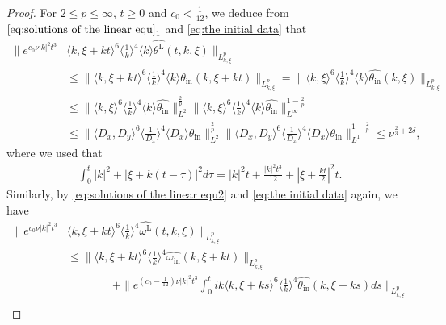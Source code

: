 \documentclass[reqno, 12pt]{amsart} %
\theoremstyle{plain} %
\theoremstyle{definition}
\theoremstyle{remark}
\numberwithin{equation}{section} %
\begin{document}
	\begin{proof}
		For $2\leq p \leq \infty$, $t\geq 0$ and $c_0 <\frac{1}{12}$, we deduce from $\eqref{eq:solutions of the linear equ}_1$ and \eqref{eq:the initial data} that
		\begin{equation*}\begin{aligned}
				\|e^{c_0 \nu |k|^2 t^3} & \langle k, \xi + kt \rangle^6\langle\frac{1}{k}\rangle^4 \langle k \rangle \widehat{\theta^{\mathrm{L}} }(t, k, \xi) \|_{L_{k, \xi}^p}\\
				&\leq \| \langle k, \xi + kt \rangle^6\langle\frac{1}{k}\rangle^4 \langle k \rangle \widehat{\theta_{\text {in}} }(k, \xi+k t) \|_{L_{k, \xi}^p} 
				= \| \langle k, \xi \rangle^6\langle\frac{1}{k}\rangle^4 \langle k \rangle \widehat{\theta_{\text {in}} }(k, \xi) \|_{L_{k, \xi}^p} \\
				&\leq  \| \langle k, \xi \rangle^6\langle\frac{1}{k}\rangle^4 \langle k \rangle \widehat{\theta_{\text {in}} } \|_{L^2}^{\frac2p} \| \langle k, \xi \rangle^6\langle\frac{1}{k}\rangle^4 \langle k \rangle \widehat{\theta_{\text {in}} }\|_{L^\infty}^{1- \frac2p} \\
				&\leq \|\langle D_x, D_y\rangle^6\langle\frac{1}{D_x}\rangle^4 \langle D_x \rangle \theta_{\mathrm{in}}\|_{L^2}^{\frac2p} \|\langle D_x, D_y\rangle^6\langle\frac{1}{D_x}\rangle^4 \langle D_x \rangle \theta_{\mathrm{in}}\|_{L^1}^{1- \frac2p} 
				\leq  \nu^{\frac23 + 2\delta},
		\end{aligned}\end{equation*}
		where we used that
		\begin{equation*}\begin{aligned}
				\int_0^t|k|^2+|\xi+k(t-\tau)|^2 d \tau =|k|^2 t+\frac{|k|^2 t^3}{12}+\left|\xi+\frac{k t}{2}\right|^2 t .
		\end{aligned}\end{equation*}
		Similarly, by \eqref{eq:solutions of the linear equ2} and \eqref{eq:the initial data} again, we have
		\begin{align*}
			\|e^{c_0 \nu |k|^2 t^3}  & \langle k, \xi + kt \rangle^6\langle\frac{1}{k}\rangle^4 \widehat{\omega^{\mathrm{L}} }(t, k, \xi) \|_{L_{k, \xi}^p}\\
			&\leq \| \langle k, \xi + kt \rangle^6\langle\frac{1}{k}\rangle^4  \widehat{\omega_{\text {in}} }(k, \xi+k t) \|_{L_{k, \xi}^p} \\
			&\qquad \qquad +  \| e^{ (c_0 - \frac{1}{12} ) \nu |k|^2 t^3}    \int_0^t ik \langle k, \xi + ks \rangle^6\langle\frac{1}{k}\rangle^4  \widehat{\theta_{\text {in}} }(k, \xi+k s) ds   \|_{L_{k, \xi}^p} \\

\end{align*}
\end{proof}
\end{document}
